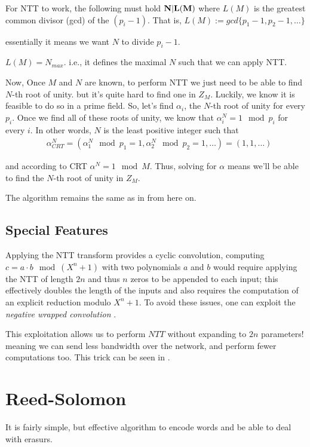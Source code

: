 For NTT to work, the following must hold $\bf N|L(M)$
where $L(M)$ is the greatest common
divisor (gcd) of the $(p_{i}-1)$. That is, 
$L(M):= gcd\{p_1-1,p_2-1,\dots\}$

essentially it means we want $ N$ to divide $p_i-1$.

\begin{corollary}
  $L(M)=N_{max}$. i.e., it defines the maximal $N$ 
  such that we can apply NTT.  
\end{corollary}

Now, Once $M$ and $N$ are known, to perform NTT we just need to be able to find 
$N$-th root of unity. but it's quite hard to find one in $Z_M$.
Luckily, we know it is feasible to do so in a prime field. 
So, let's find $\alpha_i$, the $N$-th root of unity for every $p_i$.
Once we find all of these roots of unity, we know that $\alpha_i^N=1 \mod p_i$ for every $i$.
In other words, $N$ is the least positive integer such that
\begin{align*}
  &\alpha_{CRT}^N = (\alpha_1^N \mod p_1=1, \alpha_2^N \mod p_2=1,\dots)= (1,1,\dots)
\end{align*}

and according to CRT $\alpha^N=1 \mod M$. Thus, solving for $\alpha$ 
means we'll be able to find the $N$-th root of unity in $Z_M$.

The algorithm remains the same as in  from here on.

\subsection{Special Features}
Applying the NTT transform provides a cyclic convolution, computing 
$c = a \cdot b \mod (X^n + 1)$  with two polynomials $a$ and $b$ would require 
applying the NTT of length $2n$ and thus $n$ zeros to be appended to each input;
this effectively doubles the length of the inputs and also requires the computation of 
an explicit reduction modulo $X^n +1$. 
To avoid these issues, one can exploit the \emph{negative wrapped convolution} \cite{negantt}.

This exploitation allows us to perform $NTT$ without expanding to $2n$ parameters!
meaning we can send less bandwidth over the network, and perform fewer computations too. 
This trick can be seen in \cite{SEAL}.

\section{Reed-Solomon}
It is fairly simple, but effective algorithm to encode words and be able to deal with erasurs.
